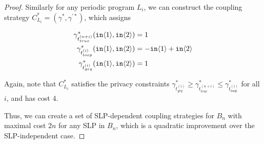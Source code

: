 \begin{proof}
    Similarly for any periodic program $L_i$, we can construct the coupling strategy $C_{L_i}^* = (\gamma^*, \gamma^{'*})$, which assigns

    \begin{align*}
        \gamma_{t_{true}^{(n + i)}}^*(\texttt{in}\langle1 \rangle, \texttt{in}\langle2 \rangle) &= 1\\
        \gamma_{t_{loop}^{(i)}}^*(\texttt{in}\langle1 \rangle, \texttt{in}\langle2 \rangle) &= -\texttt{in}\langle1 \rangle + \texttt{in}\langle2 \rangle\\
        \gamma_{t_{geq}^{(i)}}^*(\texttt{in}\langle1 \rangle, \texttt{in}\langle2 \rangle) &= 1
    \end{align*}

    Again, note that $C_{L_i}^*$ satisfies the privacy constraints $\gamma_{t_{geq}^{(i)}}^* \geq \gamma_{t_{true}^{(n + i)}}^* \leq \gamma_{t_{loop}^{(i)}}^*$ for all $i$, and has cost $4$.
    
    Thus, we can create a set of SLP-dependent coupling strategies for $B_n$ with maximal cost $2n$ for any SLP in $B_n$, which is a quadratic improvement over the SLP-independent case. 
\end{proof}



    

